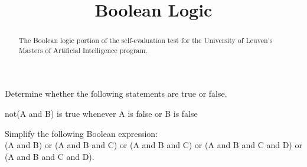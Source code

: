 \documentclass{ximera}
\title{Boolean Logic}
\begin{document}
\begin{abstract}
The Boolean logic portion of the self-evaluation test for the
University of Leuven's Masters of Artificial Intelligence program.
\end{abstract}
\maketitle


\begin{question}
Determine whether the following statements are true or false.

\begin{question}
not(A and B) is true whenever A is false or B is false
\begin{multiple-choice}
\end{multiple-choice}
\end{question}

\begin{question}
\begin{multiple-choice}
\end{multiple-choice}
\end{question}

\begin{question}
\begin{multiple-choice}
\end{multiple-choice}
\end{question}

\begin{question}
\begin{multiple-choice}
\end{multiple-choice}
\end{question}

\end{question}

\begin{question}
Simplify the following Boolean expression: \\
(A and B) or (A and B and C) or (A and B and C) or (A and B and C and D) or (A and B and C and D).
\begin{solution}
\begin{multiple-choice}
\end{multiple-choice}
\end{solution}
\end{question}
\end{document}
